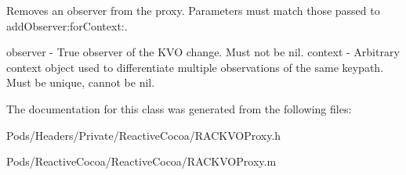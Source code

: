 Removes an observer from the proxy. Parameters must match those passed to add\+Observer\+:for\+Context\+:.

observer -\/ True observer of the K\+VO change. Must not be nil. context -\/ Arbitrary context object used to differentiate multiple observations of the same keypath. Must be unique, cannot be nil. 

The documentation for this class was generated from the following files\+:\begin{DoxyCompactItemize}
\item 
Pods/\+Headers/\+Private/\+Reactive\+Cocoa/R\+A\+C\+K\+V\+O\+Proxy.\+h\item 
Pods/\+Reactive\+Cocoa/\+Reactive\+Cocoa/R\+A\+C\+K\+V\+O\+Proxy.\+m\end{DoxyCompactItemize}
